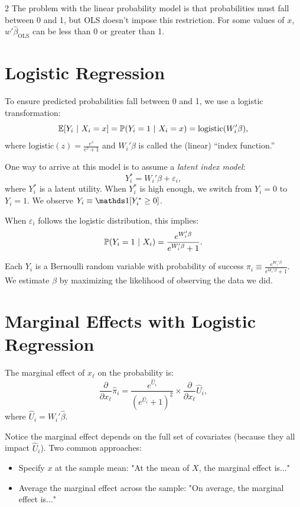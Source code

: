 \documentclass[12pt]{article}
\begin{document}
\begin{multicols}{2}
  The problem with the linear probability model is that probabilities must fall between 0 and 1, but OLS doesn't impose this restriction. For some values of $x$, $w' \hat{\beta}_{\text{OLS}}$ can be less than 0 or greater than 1.

  \section*{Logistic Regression}

  To ensure predicted probabilities fall between 0 and 1, we use a logistic transformation:
  $$\expec{Y_i}{X_i = x} = \prob{Y_i = 1}{X_i = x} = \text{logistic}(W_i' \beta),$$
  where $\text{logistic}(z) = \frac{e^z}{e^z + 1}$ and $W_i' \beta$ is called the (linear) ``index function.''

  One way to arrive at this model is to assume a \emph{latent index model}:
  $$Y_i^* = W_i' \beta + \varepsilon_i,$$
  where $Y_i^*$ is a latent utility. When $Y_i^*$ is high enough, we switch from $Y_i = 0$ to $Y_i = 1$. We observe $Y_i \equiv \one{Y_i^* \geq 0}$.

  When $\varepsilon_i$ follows the logistic distribution, this implies:
  $$\prob{Y_i = 1}{X_i} = \frac{e^{W_i'\beta}}{e^{W_i'\beta} + 1}.$$

  Each $Y_i$ is a Bernoulli random variable with probability of success $\pi_i \equiv \frac{e^{W_i'\beta}}{e^{W_i'\beta} + 1}$. We estimate $\beta$ by maximizing the likelihood of observing the data we did.

  \section*{Marginal Effects with Logistic Regression}

  The marginal effect of $x_\ell$ on the probability is:
  $$\frac{\partial}{\partial x_\ell} \hat{\pi}_i = \frac{e^{\hat{U}_i}}{(e^{\hat{U}_i} + 1)^2} \times \frac{\partial}{\partial x_\ell} \hat{U}_i,$$
  where $\hat{U}_i = W_i' \hat{\beta}$.

  Notice the marginal effect depends on the full set of covariates (because they all impact $\hat{U}_i$). Two common approaches:
  \begin{itemize}
    \item Specify $x$ at the sample mean: "At the mean of $X$, the marginal effect is..."
    \item Average the marginal effect across the sample: "On average, the marginal effect is..."
  \end{itemize}


\end{multicols}
\end{document}
